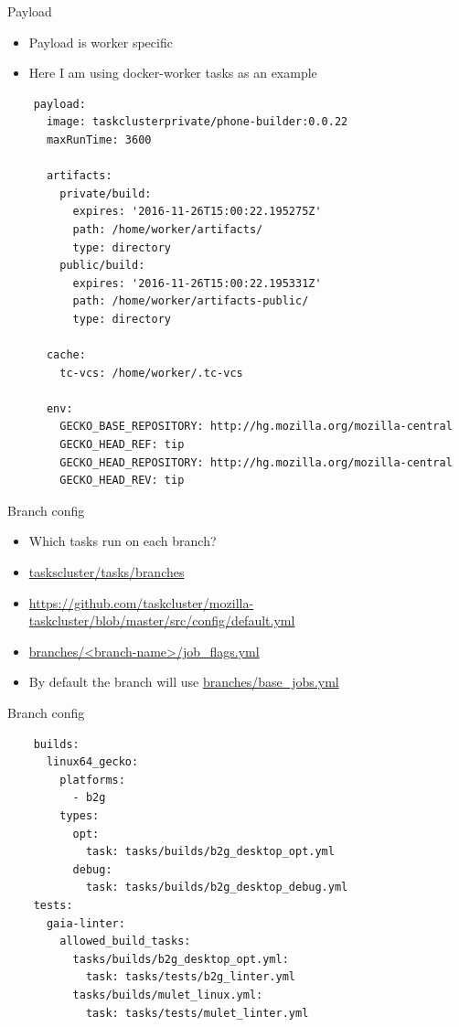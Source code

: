 \documentclass[pdf]{beamer}
\begin{document}
\begin{frame}[fragile]{Payload}
  \footnotesize
  \begin{itemize}
    \item Payload is worker specific
    \item Here I am using docker-worker tasks as an example
  \end{itemize}
  \tiny
  \begin{lstlisting}
    payload:
      image: taskclusterprivate/phone-builder:0.0.22
      maxRunTime: 3600

      artifacts:
        private/build:
          expires: '2016-11-26T15:00:22.195275Z'
          path: /home/worker/artifacts/
          type: directory
        public/build:
          expires: '2016-11-26T15:00:22.195331Z'
          path: /home/worker/artifacts-public/
          type: directory

      cache:
        tc-vcs: /home/worker/.tc-vcs

      env:
        GECKO_BASE_REPOSITORY: http://hg.mozilla.org/mozilla-central
        GECKO_HEAD_REF: tip
        GECKO_HEAD_REPOSITORY: http://hg.mozilla.org/mozilla-central
        GECKO_HEAD_REV: tip
  \end{lstlisting}
\end{frame}

\begin{frame}{Branch config}
  \begin{itemize}
    \item Which tasks run on each branch?
    \item \url{taskscluster/tasks/branches}
    \item \url{https://github.com/taskcluster/mozilla-taskcluster/blob/master/src/config/default.yml}
    \item \url{branches/<branch-name>/job_flags.yml}
    \item By default the branch will use \url{branches/base_jobs.yml}
  \end{itemize}
\end{frame}

\begin{frame}[fragile]{Branch config}
  \scriptsize
  \begin{lstlisting}
    builds:
      linux64_gecko:
        platforms:
          - b2g
        types:
          opt:
            task: tasks/builds/b2g_desktop_opt.yml
          debug:
            task: tasks/builds/b2g_desktop_debug.yml
    tests:
      gaia-linter:
        allowed_build_tasks:
          tasks/builds/b2g_desktop_opt.yml:
            task: tasks/tests/b2g_linter.yml
          tasks/builds/mulet_linux.yml:
            task: tasks/tests/mulet_linter.yml
  \end{lstlisting}
\end{frame}
\end{document}
